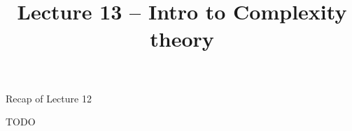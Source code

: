 \documentclass[handout]{beamer}
\title{Lecture 13 -- Intro to Complexity theory}
\begin{document}
\frame{\titlepage}


\begin{frame}{Recap of Lecture 12}
	
    TODO
	
\end{frame}
\end{document}
